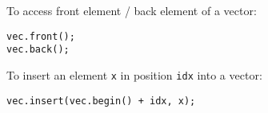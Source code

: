To access front element / back element of a vector:
\begin{lstlisting}
vec.front();
vec.back();
\end{lstlisting}
To insert an element \texttt{x} in position \texttt{idx} into a vector:
\begin{lstlisting}
vec.insert(vec.begin() + idx, x);
\end{lstlisting}

